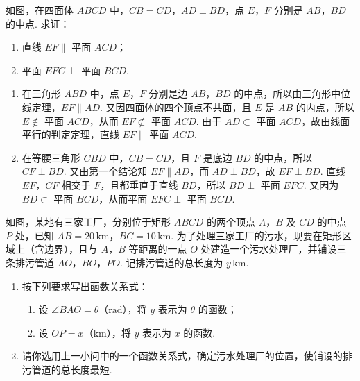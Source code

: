 \begin{problem}
如图，在四面体 \(ABCD\) 中，\(CB = CD\)，\(AD \perp BD\)，点 \(E\)，\(F\) 分别是 \(AB\)，\(BD\) 的中点. 求证：

\begin{enumerate}
\item 直线 \(EF \parallel\) 平面 \(ACD\)；
\item 平面 \(EFC \perp\) 平面 \(BCD\).
\end{enumerate}

\end{problem}

\begin{solution}
\begin{enumerate}
\item 在三角形 \(ABD\) 中，点 \(E\)，\(F\) 分别是边 \(AB\)，\(BD\) 的中点，所以由三角形中位线定理，\(EF\parallel AD\). 又因四面体的四个顶点不共面，且 \(E\) 是 \(AB\) 的内点，所以 \(E\notin\) 平面 \(ACD\)，从而 \(EF\not\subset\) 平面 \(ACD\). 由于 \(AD\subset\) 平面 \(ACD\)，故由线面平行的判定定理，直线 \(EF\parallel\) 平面 \(ACD\).

\item 在等腰三角形 \(CBD\) 中，\(CB=CD\)，且 \(F\) 是底边 \(BD\) 的中点，所以 \(CF\perp BD\). 又由第一个结论知 \(EF\parallel AD\)，而 \(AD\perp BD\)，故 \(EF\perp BD\). 直线 \(EF\)，\(CF\) 相交于 \(F\)，且都垂直于直线 \(BD\)，所以 \(BD\perp\) 平面 \(EFC\). 又因为 \(BD\subset\) 平面 \(BCD\)，从而平面 \(EFC\perp\) 平面 \(BCD\).
\end{enumerate}
\end{solution}

\begin{problem}
如图，某地有三家工厂，分别位于矩形 \(ABCD\) 的两个顶点 \(A\)，\(B\) 及 \(CD\) 的中点 \(P\) 处，已知 \(AB = 20\,\mathrm{km}\)，\(BC = 10\,\mathrm{km}\). 为了处理三家工厂的污水，现要在矩形区域上（含边界），且与 \(A\)，\(B\) 等距离的一点 \(O\) 处建造一个污水处理厂，并铺设三条排污管道 \(AO\)，\(BO\)，\(PO\). 记排污管道的总长度为 \(y\,\mathrm{km}\).

\begin{enumerate}
\item 按下列要求写出函数关系式：
\begin{enumerate}
\item 设 \(\angle BAO = \theta\)（\(\mathrm{rad}\)），将 \(y\) 表示为 \(\theta\) 的函数；
\item 设 \(OP = x\)（\(\mathrm{km}\)），将 \(y\) 表示为 \(x\) 的函数.
\end{enumerate}
\item 请你选用上一小问中的一个函数关系式，确定污水处理厂的位置，使铺设的排污管道的总长度最短.
\end{enumerate}

\end{problem}

